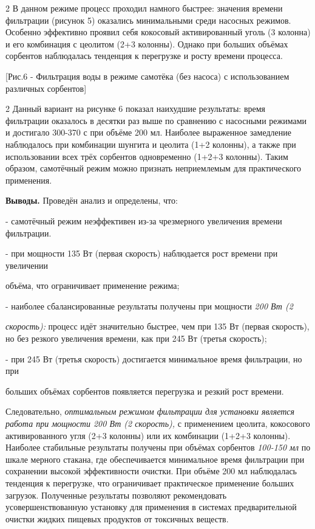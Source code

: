 \begin{multicols}{2}
В данном режиме процесс проходил намного быстрее: значения времени
фильтрации (рисунок 5) оказались минимальными среди насосных режимов.
Особенно эффективно проявил себя кокосовый активированный уголь (3
колонна) и его комбинация с цеолитом (2+3 колонны). Однако при больших
объёмах сорбентов наблюдалась тенденция к перегрузке и росту времени
процесса.
\end{multicols}

[Рис.6 - Фильтрация воды в режиме самотёка (без насоса) с
использованием различных сорбентов]

\begin{multicols}{2}
Данный вариант на рисунке 6 показал наихудшие результаты: время
фильтрации оказалось в десятки раз выше по сравнению с насосными
режимами и достигало 300-370 с при объёме 200 мл. Наиболее выраженное
замедление наблюдалось при комбинации шунгита и цеолита (1+2 колонны), а
также при использовании всех трёх сорбентов одновременно (1+2+3
колонны). Таким образом, самотёчный режим можно признать неприемлемым
для практического применения.

{\bfseries Выводы.} Проведён анализ и определены, что:

- самотёчный режим неэффективен из-за чрезмерного увеличения времени
фильтрации.

- при мощности 135 Вт (первая скорость) наблюдается рост времени при
увеличении

объёма, что ограничивает применение режима;

- наиболее сбалансированные результаты получены при мощности \emph{200
Вт (2}

\emph{скорость):} процесс идёт значительно быстрее, чем при 135 Вт
(первая скорость), но без резкого увеличения времени, как при 245 Вт
(третья скорость);

- при 245 Вт (третья скорость) достигается минимальное время фильтрации,
но при

больших объёмах сорбентов появляется перегрузка и резкий рост времени.

Следовательно, \emph{оптимальным режимом фильтрации для установки
является работа при мощности 200 Вт (2 скорость),} с применением
цеолита, кокосового активированного угля (2+3 колонны) или их комбинации
(1+2+3 колонны). Наиболее стабильные результаты получены при объёмах
сорбентов \emph{100-150 мл} по шкале мерного стакана, где обеспечивается
минимальное время фильтрации при сохранении высокой эффективности
очистки. При объёме 200 мл наблюдалась тенденция к перегрузке, что
ограничивает практическое применение больших загрузок. Полученные
результаты позволяют рекомендовать усовершенствованную установку для
применения в системах предварительной очистки жидких пищевых продуктов
от токсичных веществ.
\end{multicols}

